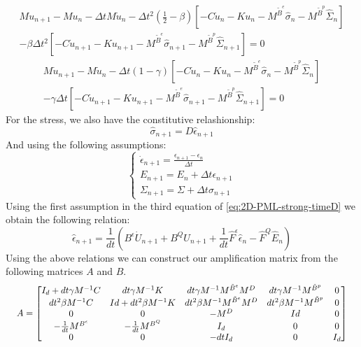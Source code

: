 \begin{align}
		M u_{n+1} - M u_n - \Delta t M \dot{u}_n - \Delta t^2 \left(\frac{1}{2}-\beta\right) \left[ - C \dot{u}_{n} 
-K u_{n} - M^{\tilde{B}^{e}} \hat{\sigma}_{n} - M^{\tilde{B}^{p}}\hat{\Sigma}_{n}\right] \\ - \beta \Delta t^2 \left[-C \dot{u}_{n+1} 
-K u_{n+1} - M^{\tilde{B}^{e}} \hat{\sigma}_{n+1} - M^{\tilde{B}^{p}}\hat{\Sigma}_{n+1}\right] = 0  
\end{align}
\begin{align}
		M \dot{u}_{n+1} - M \dot{u}_n - \Delta t (1-\gamma) \left[ - C \dot{u}_{n} 
-K u_{n} - M^{\tilde{B}^{e}} \hat{\sigma}_{n} - M^{\tilde{B}^{p}}\hat{\Sigma}_{n}\right] \\ - \gamma \Delta t \left[-C \dot{u}_{n+1} 
-K u_{n+1} - M^{\tilde{B}^{e}} \hat{\sigma}_{n+1} - M^{\tilde{B}^{p}}\hat{\Sigma}_{n+1}\right] = 0
\label{eq:3Main-relations-V2}
\end{align}
For the stress, we also have the constitutive relashionship:
\begin{equation}
\hat{\sigma}_{n+1} = D \hat{\epsilon}_{n+1}
\end{equation} 
And using the following assumptions:
\begin{equation}
\begin{cases}
\dot{\epsilon}_{n+1} = \frac{\epsilon_{n+1}-\epsilon_n}{\Delta t} \\
E_{n+1} = E_n + \Delta t \epsilon_{n+1} \\
\Sigma_{n+1} = \Sigma + \Delta t \sigma_{n+1}
\end{cases}
\end{equation}
Using the first assumption in the third equation of \ref{eq:2D-PML-strong-timeD} we obtain the following relation:
\begin{equation}
\hat{\epsilon}_{n+1} = \frac{1}{dt}\left(B^\epsilon \dot{U}_{n+1} + B^Q U_{n+1} + \frac{1}{dt} \hat{F}^\epsilon \hat{\epsilon}_n - \hat{F}^Q \hat{E}_n\right)
\end{equation}
Using the above relations we can construct our amplification matrix from the following matrices $A$ and $B$.
\begin{equation}
\resizebox{\columnwidth}{!}{
$
A = \begin{bmatrix}
I_d + dt \gamma M^{-1} C & dt \gamma M^{-1} K & dt \gamma M^{-1} M^{\tilde{B}^{e}}M^D& dt \gamma M^{-1} M^{\tilde{B}^{p}} & 0 \\
dt^2 \beta M^{-1} C & Id + dt^2 \beta M^{-1}K & dt^2 \beta M^{-1} M^{\tilde{B}^{e}}M^D & d t^2 \beta M^{-1} M^{\tilde{B}^{p}}  & 0 \\
0 & 0 & -M^D & Id & 0 \\
-\frac{1}{dt} M^{B^\epsilon} & -\frac{1}{dt}M^{B^Q} & I_d & 0 & 0\\
0 & 0 & -dt I_d & 0 & I_d 
\end{bmatrix}
$
}
\label{eq:A}
\end{equation}
